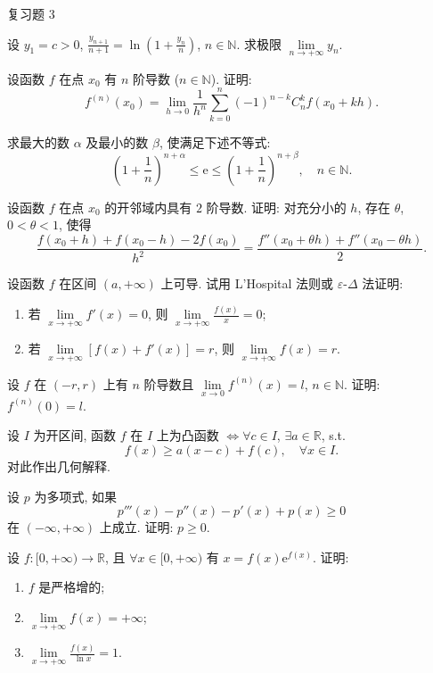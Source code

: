 \begin{exblock}{复习题 3}
    \item 设 $y_{1}=c>0$, $\frac{y_{n+1}}{n+1}=\ln\left(1+\frac{y_{n}}{n}\right)$, $n\in\mathbb{N}$. 求极限 $\lim\limits_{n\to+\infty}y_{n}$.

    \item 设函数 $f$ 在点 $x_{0}$ 有 $n$ 阶导数 ($n\in\mathbb{N}$). 证明:
    \[
    f^{(n)}(x_{0})=\lim_{h\to 0}\frac{1}{h^{n}}\sum_{k=0}^{n}(-1)^{n-k}C_{n}^{k}f(x_{0}+kh).
\]

    \item 求最大的数 $\alpha$ 及最小的数 $\beta$, 使满足下述不等式:
    \[
    \left(1+\frac{1}{n}\right)^{n+\alpha}\leqslant\mathrm{e}\leqslant\left(1+\frac{1}{n}\right)^{n+\beta},\quad n\in\mathbb{N}.
\]

    \item 设函数 $f$ 在点 $x_{0}$ 的开邻域内具有 $2$ 阶导数. 证明: 对充分小的 $h$, 存在 $\theta$, $0<\theta<1$, 使得
    \[
    \frac{f(x_{0}+h)+f(x_{0}-h)-2f(x_{0})}{h^{2}}=\frac{f''(x_{0}+\theta h)+f''(x_{0}-\theta h)}{2}.
\]

    \item 设函数 $f$ 在区间 $(a,+\infty)$ 上可导. 试用 L'Hospital 法则或 $\varepsilon\text{-}\Delta$ 法证明:
    \begin{enumerate}[label=(\arabic*)]
        \item 若 $\lim\limits_{x\to+\infty}f'(x)=0$, 则 $\lim\limits_{x\to+\infty}\frac{f(x)}{x}=0$;
        \item 若 $\lim\limits_{x\to+\infty}[f(x)+f'(x)]=r$, 则 $\lim\limits_{x\to+\infty}f(x)=r$.
    \end{enumerate}

    \item 设 $f$ 在 $(-r,r)$ 上有 $n$ 阶导数且 $\lim\limits_{x\to 0}f^{(n)}(x)=l$, $n\in\mathbb{N}$. 证明: $f^{(n)}(0)=l$.

    \item 设 $I$ 为开区间, 函数 $f$ 在 $I$ 上为凸函数 $\Longleftrightarrow \forall c\in I$, $\exists a\in\mathbb{R}$, s.t.
    \[
    f(x)\geqslant a(x-c)+f(c),\quad \forall x\in I.
\]
    对此作出几何解释.

    \item 设 $p$ 为多项式, 如果
    \[
    p'''(x)-p''(x)-p'(x)+p(x)\geqslant 0
\]
    在 $(-\infty,+\infty)$ 上成立. 证明: $p\geqslant 0$.

    \item 设 $f:[0,+\infty)\to\mathbb{R}$, 且 $\forall x\in[0,+\infty)$ 有 $x=f(x)\mathrm{e}^{f(x)}$. 证明:
    \begin{enumerate}[label=(\arabic*)]
        \item $f$ 是严格增的;
        \item $\lim\limits_{x\to+\infty}f(x)=+\infty$;
        \item $\lim\limits_{x\to+\infty}\frac{f(x)}{\ln x}=1$.
    \end{enumerate}


\end{exblock}
